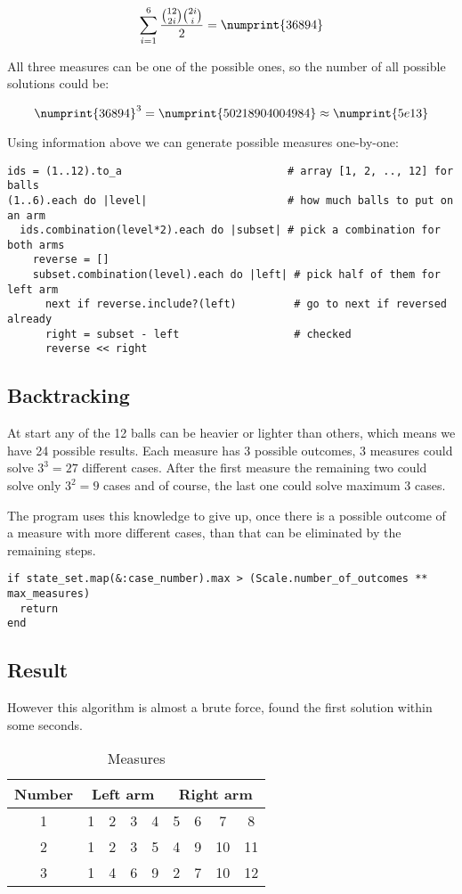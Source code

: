 \documentclass[11pt]{article} %
\begin{document}
\[ \sum_{i=1}^{6} \frac{\binom{12}{2i} \binom{2i}{i}}{2} = \numprint{36894} \]

All three measures can be one of the  possible ones, so the number of all possible solutions could be:

\[ \numprint{36894}^3 = \numprint{50218904004984} \approx \numprint{5e13} \]

Using information above we can generate possible measures one-by-one:

\begin{verbatim}
ids = (1..12).to_a                          # array [1, 2, .., 12] for balls
(1..6).each do |level|                      # how much balls to put on an arm
  ids.combination(level*2).each do |subset| # pick a combination for both arms
    reverse = []
    subset.combination(level).each do |left| # pick half of them for left arm
      next if reverse.include?(left)         # go to next if reversed already
      right = subset - left                  # checked
      reverse << right
\end{verbatim}

\subsection{Backtracking}

At start any of the 12 balls can be heavier or lighter than others, which means we have 24 possible results. Each measure has 3 possible outcomes, 3 measures could solve $3^3 = 27$ different cases. After the first measure the remaining two could solve only $3^2 = 9$ cases and of course, the last one could solve maximum 3 cases.

The program uses this knowledge to give up, once there is a possible outcome of a measure with more different cases, than that can be eliminated by the remaining steps.

\begin{verbatim}
if state_set.map(&:case_number).max > (Scale.number_of_outcomes ** max_measures)
  return
end
\end{verbatim}

\subsection{Result} \label{one_result}

However this algorithm is almost a brute force, found the first solution within some seconds.

\begin{table}[h]
\begin{center}
\begin{tabular}{c|cccc|cccc}
  \toprule
  Number & \multicolumn{4}{c|}{Left arm} & \multicolumn{4}{c}{Right arm} \\
  \midrule
       1 & 1 & 2 & 3 & 4 & 5 & 6 & 7 & 8 \\
       2 & 1 & 2 & 3 & 5 & 4 & 9 & 10 & 11 \\
       3 & 1 & 4 & 6 & 9 & 2 & 7 & 10 & 12 \\
  \bottomrule
\end{tabular}
\end{center}
\caption{Measures}
\end{table}
\end{document}
